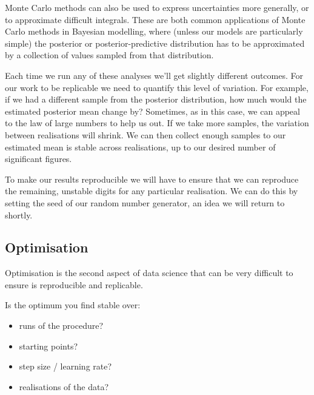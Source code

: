 \documentclass[
  letterpaper,
  DIV=11,
  numbers=noendperiod]{scrreprt}
\providecommand{\tightlist}{%
  \setlength{\itemsep}{0pt}\setlength{\parskip}{0pt}}\usepackage{longtable,booktabs,array}
\begin{document}
Monte Carlo methods can also be used to express uncertainties more
generally, or to approximate difficult integrals. These are both common
applications of Monte Carlo methods in Bayesian modelling, where (unless
our models are particularly simple) the posterior or
posterior-predictive distribution has to be approximated by a collection
of values sampled from that distribution.

Each time we run any of these analyses we'll get slightly different
outcomes. For our work to be replicable we need to quantify this level
of variation. For example, if we had a different sample from the
posterior distribution, how much would the estimated posterior mean
change by? Sometimes, as in this case, we can appeal to the law of large
numbers to help us out. If we take more samples, the variation between
realisations will shrink. We can then collect enough samples to our
estimated mean is stable across realisations, up to our desired number
of significant figures.

To make our results reproducible we will have to ensure that we can
reproduce the remaining, unstable digits for any particular realisation.
We can do this by setting the seed of our random number generator, an
idea we will return to shortly.

\subsection{Optimisation}\label{optimisation}

Optimisation is the second aspect of data science that can be very
difficult to ensure is reproducible and replicable.

Is the optimum you find stable over:

\begin{itemize}
\tightlist
\item
  runs of the procedure?
\item
  starting points?
\item
  step size / learning rate?
\item
  realisations of the data?
\end{itemize}
\end{document}
